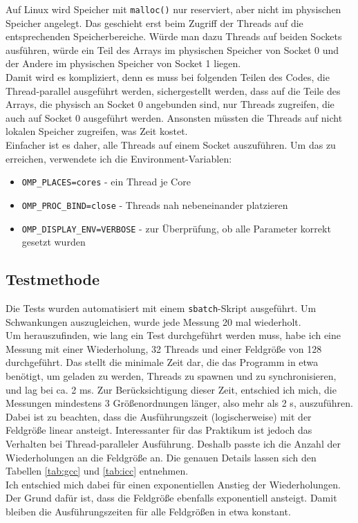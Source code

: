 \documentclass[german,plainarticle,hyperref,utf8]{zihpub}
\begin{document}
	Auf Linux wird Speicher mit \texttt{malloc()} nur reserviert, aber nicht im physischen Speicher angelegt. Das geschieht erst beim Zugriff der Threads auf die entsprechenden Speicherbereiche. Würde man dazu Threads auf beiden Sockets ausführen, würde ein Teil des Arrays im physischen Speicher von Socket 0 und der Andere im physischen Speicher von Socket 1 liegen.\\
	Damit wird es kompliziert, denn es muss bei folgenden Teilen des Codes, die Thread-parallel ausgeführt werden, sichergestellt werden, dass auf die Teile des Arrays, die physisch an Socket 0 angebunden sind, nur Threads zugreifen, die auch auf Socket 0 ausgeführt werden. Ansonsten müssten die Threads auf nicht lokalen Speicher zugreifen, was Zeit kostet.\\
	Einfacher ist es daher, alle Threads auf einem Socket auszuführen. Um das zu erreichen, verwendete ich die Environment-Variablen:
	\begin{itemize}
		\item \texttt{OMP\_PLACES=cores} - ein Thread je Core
		\item \texttt{OMP\_PROC\_BIND=close} - Threads nah nebeneinander platzieren
		\item \texttt{OMP\_DISPLAY\_ENV=VERBOSE} - zur Überprüfung, ob alle Parameter korrekt gesetzt wurden
	\end{itemize}	
	\subsection{Testmethode}
	Die Tests wurden automatisiert mit einem \texttt{sbatch}-Skript ausgeführt. Um Schwankungen auszugleichen, wurde jede Messung 20 mal wiederholt.\\
	Um herauszufinden, wie lang ein Test durchgeführt werden muss, habe ich eine Messung mit einer Wiederholung, 32 Threads und einer Feldgröße von 128 durchgeführt. Das stellt die minimale Zeit dar, die das Programm in etwa benötigt, um geladen zu werden, Threads zu spawnen und zu synchronisieren, und lag bei ca. 2 ms. Zur Berücksichtigung dieser Zeit, entschied ich mich, die Messungen mindestens 3 Größenordnungen länger, also mehr als 2 s, auszuführen.\\
	Dabei ist zu beachten, dass die Ausführungszeit (logischerweise) mit der Feldgröße linear ansteigt. Interessanter für das Praktikum ist jedoch das Verhalten bei Thread-paralleler Ausführung. Deshalb passte ich die Anzahl der Wiederholungen an die Feldgröße an. Die genauen Details lassen sich den Tabellen \ref{tab:gcc} und
	\ref{tab:icc} entnehmen.\\
	Ich entschied mich dabei für einen exponentiellen Anstieg der Wiederholungen. Der Grund dafür ist, dass die Feldgröße ebenfalls exponentiell ansteigt. Damit bleiben die Ausführungszeiten für alle Feldgrößen in etwa konstant.
	\newpage
\end{document}
